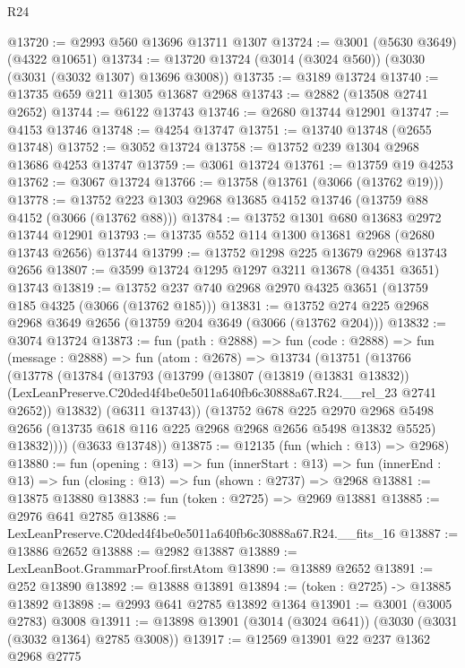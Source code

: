 \begin{lexlean}{R24}
\begin{coremodule}
@13720 := @2993 @560 @13696 @13711 @1307
@13724 := @3001 (@5630 @3649) (@4322 @10651)
@13734 := @13720 @13724 (@3014 (@3024 @560)) (@3030 (@3031 (@3032 @1307) @13696 @3008))
@13735 := @3189 @13724
@13740 := @13735 @659 @211 @1305 @13687 @2968
@13743 := @2882 (@13508 @2741 @2652)
@13744 := @6122 @13743
@13746 := @2680 @13744 @12901
@13747 := @4153 @13746
@13748 := @4254 @13747
@13751 := @13740 @13748 (@2655 @13748)
@13752 := @3052 @13724
@13758 := @13752 @239 @1304 @2968 @13686 @4253 @13747
@13759 := @3061 @13724
@13761 := @13759 @19 @4253
@13762 := @3067 @13724
@13766 := @13758 (@13761 (@3066 (@13762 @19)))
@13778 := @13752 @223 @1303 @2968 @13685 @4152 @13746 (@13759 @88 @4152 (@3066 (@13762 @88)))
@13784 := @13752 @1301 @680 @13683 @2972 @13744 @12901
@13793 := @13735 @552 @114 @1300 @13681 @2968 (@2680 @13743 @2656) @13744
@13799 := @13752 @1298 @225 @13679 @2968 @13743 @2656
@13807 := @3599 @13724 @1295 @1297 @3211 @13678 (@4351 @3651) @13743
@13819 := @13752 @237 @740 @2968 @2970 @4325 @3651 (@13759 @185 @4325 (@3066 (@13762 @185)))
@13831 := @13752 @274 @225 @2968 @2968 @3649 @2656 (@13759 @204 @3649 (@3066 (@13762 @204)))
@13832 := @3074 @13724
@13873 := fun (path : @2888) =>
  fun (code : @2888) =>
  fun (message : @2888) =>
  fun (atom : @2678) =>
  @13734
    (@13751
      (@13766
        (@13778
          (@13784
            (@13793
              (@13799
                (@13807
                  (@13819 (@13831 @13832))
                  (LexLeanPreserve.C20ded4f4be0e5011a640fb6c30888a67.R24.__rel_23 @2741 @2652))
                @13832)
              (@6311 @13743))
            (@13752
              @678
              @225
              @2970
              @2968
              @5498
              @2656
              (@13735 @618 @116 @225 @2968 @2968 @2656 @5498 @13832 @5525)
              @13832))))
      (@3633 @13748))
@13875 := @12135 (fun (which : @13) => @2968)
@13880 := fun (opening : @13) =>
  fun (innerStart : @13) =>
  fun (innerEnd : @13) => fun (closing : @13) => fun (shown : @2737) => @2968
@13881 := @13875 @13880
@13883 := fun (token : @2725) => @2969 @13881
@13885 := @2976 @641 @2785
@13886 := LexLeanPreserve.C20ded4f4be0e5011a640fb6c30888a67.R24.__fits_16
@13887 := @13886 @2652
@13888 := @2982 @13887
@13889 := LexLeanBoot.GrammarProof.firstAtom
@13890 := @13889 @2652
@13891 := @252 @13890
@13892 := @13888 @13891
@13894 := (token : @2725) -> @13885 @13892
@13898 := @2993 @641 @2785 @13892 @1364
@13901 := @3001 (@3005 @2783) @3008
@13911 := @13898 @13901 (@3014 (@3024 @641)) (@3030 (@3031 (@3032 @1364) @2785 @3008))
@13917 := @12569 @13901 @22 @237 @1362 @2968 @2775

\end{coremodule}
\end{lexlean}
